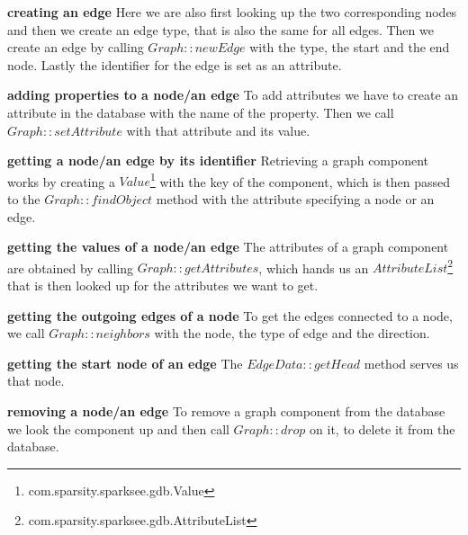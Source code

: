 \textbf{creating an edge} \newline
Here we are also first looking up the two corresponding nodes and then we create an edge type,
that is also the same for all edges.
Then we create an edge by calling $ Graph::newEdge $ with the type,
the start and the end node.
Lastly the identifier for the edge is set as an attribute.

\textbf{adding properties to a node/an edge} \newline
To add attributes we have to create an attribute in the database with the name of the property.
Then we call $ Graph::setAttribute $ with that attribute and its value.

\textbf{getting a node/an edge by its identifier} \newline
Retrieving a graph component works by creating a $ Value $\footnote{com.sparsity.sparksee.gdb.Value} with the key of the component,
which is then passed to the $ Graph::findObject $ method with the attribute specifying a node or an edge.

\textbf{getting the values of a node/an edge} \newline
The attributes of a graph component are obtained by calling $ Graph::getAttributes $,
which hands us an $ AttributeList $\footnote{com.sparsity.sparksee.gdb.AttributeList} that is then looked up for the attributes we want to get.

\textbf{getting the outgoing edges of a node} \newline
To get the edges connected to a node,
we call $ Graph::neighbors $ with the node, the type of edge and the direction.

\textbf{getting the start node of an edge} \newline
The $ EdgeData::getHead $ method serves us that node.

\textbf{removing a node/an edge} \newline
To remove a graph component from the database we look the component up and then call $ Graph::drop $ on it,
to delete it from the database.

